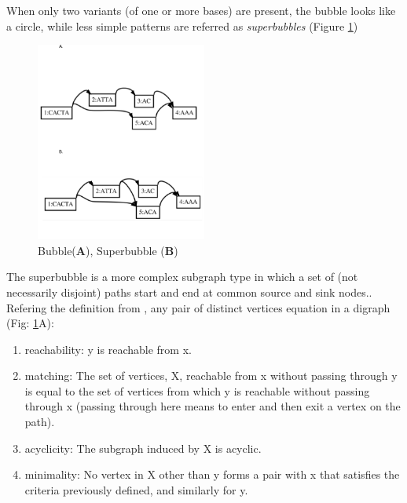 When only two variants (of one or more bases) are present, the bubble looks like a circle, while less simple patterns are referred as \textit{superbubbles} (Figure \ref{fig:sup_bub.png})

\begin{figure}[H]
\centering
\includegraphics[width=0.50\textwidth]{fig/bub_sup.png}
\decoRule
\caption{Bubble(\textbf{A}), Superbubble (\textbf{B})}
\label{fig:sup_bub.png}
\end{figure}


The superbubble is a more complex subgraph type in which a set of (not necessarily disjoint) paths start and end at common source and sink nodes.\cite{paten2018superbubbles}.
Refering the definition from \cite{onodera2013detecting}, any pair of distinct vertices equation in a digraph (Fig: \ref{fig:sup_bub.png}A):
\begin{enumerate}
\item reachability: y is reachable from x.

\item matching: The set of vertices, X, reachable from x without passing through y is equal to the set of vertices from which y is reachable without passing through x (passing through here means to enter and then exit a vertex on the path).

\item acyclicity: The subgraph induced by X is acyclic.

\item minimality: No vertex in X other than y forms a pair with x that satisfies the criteria previously defined, and similarly for y.


\end{enumerate}

